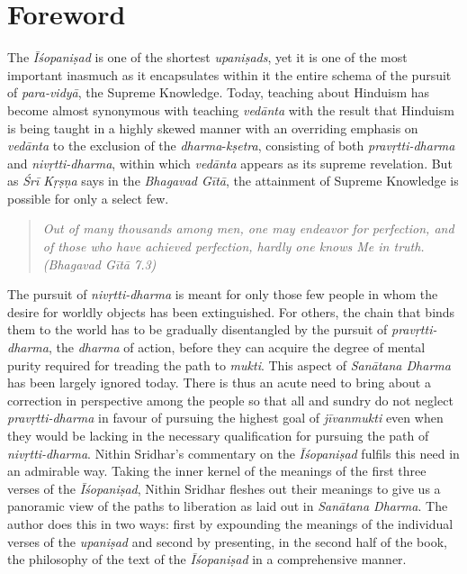 \chapter{Foreword}

The \emph{Īśopaniṣad} is one of the shortest \emph{upaniṣads}, yet it is one of the most important inasmuch as it encapsulates within it the entire schema of the pursuit of \emph{para-vidyā}, the Supreme Knowledge. Today, teaching about Hinduism has become almost synonymous with teaching \emph{vedānta} with the result that Hinduism is being taught in a highly skewed manner with an overriding emphasis on \emph{vedānta} to the exclusion of the \emph{dharma}-\emph{kṣetra}, consisting of both \emph{pravṛtti-dharma} and \emph{nivṛtti-dharma}, within which \emph{vedānta} appears as its supreme revelation. But as \emph{Śrī Kṛṣṇa} says in the \emph{Bhagavad Gītā}, the attainment of Supreme Knowledge is possible for only a select few.

\begin{quote}
\emph{Out of many thousands among men, one may endeavor for perfection, and of those who have achieved perfection, hardly one knows Me in truth. (Bhagavad Gītā 7.3)}
\end{quote}

The pursuit of \emph{nivṛtti-dharma} is meant for only those few people in whom the desire for worldly objects has been extinguished. For others, the chain that binds them to the world has to be gradually disentangled by the pursuit of \emph{pravṛtti-dharma}, the \emph{dharma} of action, before they can acquire the degree of mental purity required for treading the path to \emph{mukti}. This aspect of \emph{Sanātana Dharma} has been largely ignored today. There is thus an acute need to bring about a correction in perspective among the people so that all and sundry do not neglect \emph{pravṛtti-dharma} in favour of pursuing the highest goal of \emph{jīvanmukti} even when they would be lacking in the necessary qualification for pursuing the path of \emph{nivṛtti-dharma}. Nithin Sridhar's commentary on the \emph{Īśopaniṣad} fulfils this need in an admirable way. Taking the inner kernel of the meanings of the first three verses of the \emph{Īśopaniṣad}, Nithin Sridhar fleshes out their meanings to give us a panoramic view of the paths to liberation as laid out in \emph{Sanātana Dharma}. The author does this in two ways: first by expounding the meanings of the individual verses of the \emph{upaniṣad} and second by presenting, in the second half of the book, the philosophy of the text of the \emph{Īśopaniṣad} in a comprehensive manner.


